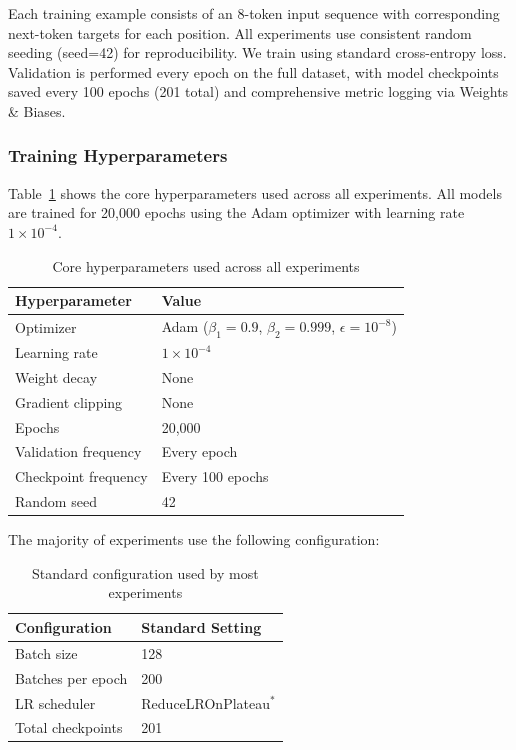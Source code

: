 \documentclass[prx,nofootinbib,onecolumn,showkeys,groupaddress,preprintnumbers,floatfix,
superscriptaddress]{revtex4-1}
\begin{document}
Each training example consists of an 8-token input sequence with corresponding next-token targets for each position. All experiments use consistent random seeding (seed=42) for reproducibility. We train using standard cross-entropy loss. Validation is performed every epoch on the full dataset, with model checkpoints saved every 100 epochs (201 total) and comprehensive metric logging via Weights \& Biases.


\subsubsection{Training Hyperparameters}

Table~\ref{tab:hyperparams} shows the core hyperparameters used across all experiments. All models are trained for 20,000 epochs using the Adam optimizer with learning rate $1 \times 10^{-4}$.

\begin{table}[h]
\centering
\caption{Core hyperparameters used across all experiments}
\label{tab:hyperparams}
\begin{tabular}{ll}
\toprule
\textbf{Hyperparameter} & \textbf{Value} \\
\midrule
Optimizer & Adam ($\beta_1=0.9$, $\beta_2=0.999$, $\epsilon=10^{-8}$) \\
Learning rate & $1 \times 10^{-4}$ \\
Weight decay & None \\
Gradient clipping & None \\
Epochs & 20,000 \\
Validation frequency & Every epoch \\
Checkpoint frequency & Every 100 epochs \\
Random seed & 42 \\
\bottomrule
\end{tabular}
\end{table}

The majority of experiments use the following configuration:

\begin{table}[H]
\centering
\caption{Standard configuration used by most experiments}
\label{tab:standard_config}
\begin{tabular}{ll}
\toprule
\textbf{Configuration} & \textbf{Standard Setting} \\
\midrule
Batch size & 128 \\
Batches per epoch & 200 \\
LR scheduler & ReduceLROnPlateau$^*$ \\
Total checkpoints & 201 \\
\bottomrule
\end{tabular}
\end{table}
\end{document}
